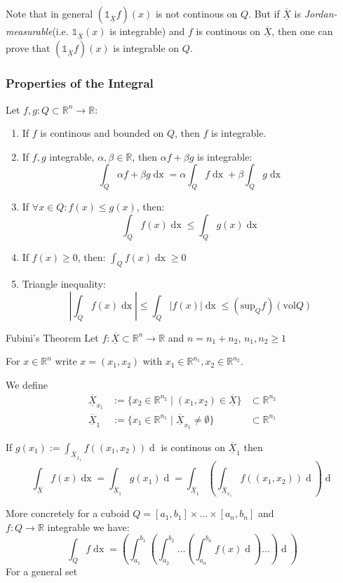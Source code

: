 \documentclass[a4paper,fontsize = 8pt]{scrartcl}
\def\R{\mathbb{R}}
\def\X{\underline{\overline{X}}}
\begin{document}
Note that in general $(\mathds{1}_{\X}f)(x)$ is not continous on $Q$. But if $\X$ is \textit{Jordan-measurable}(i.e. $\mathds{1}_{\X}(x)$ is integrable) and $f$ is continous on $\X$, then one can prove that $(\mathds{1}_{\X}f)(x)$ is integrable on $Q$.

\subsubsection{Properties of the Integral}
Let $f, g: Q \subset \R^n \to \R$:
\begin{enumerate}
  \item If $f$ is continous and bounded on $Q$, then $f$ is integrable.
  \item If $f,g$ integrable, $\alpha, \beta \in \R$, then $\alpha f + \beta g$ is integrable:
  \[\int_Q \alpha f + \beta g \mathop{dx} = \alpha \int_Q f \mathop{dx} + \beta \int_Q g \mathop{dx}\]
  \item If \(\forall x \in Q: f(x) \le g(x)\), then:
  \[\int_Q f(x) \mathop{dx} \le \int_Q g(x) \mathop{dx}\]
  \item If \(f(x) \ge 0\), then:
  \(\int_Q f(x) \mathop{dx} \geq 0\)
  \item Triangle inequality:
    \[\left| \int_Q f(x) \mathop{dx}\right| \le \int_Q \left|f(x)\right| \mathop{dx} \leq (\text{sup}_{Q}f)(\text{vol}Q)\]
\end{enumerate}


\begin{mainbox}{Fubini's Theorem}
    Let $f: \X \subset \R^n \to \R$ and $n = n_1 + n_2$, $n_1, n_2 \geq 1$
    
    For $x \in \R^n$ write $x = (x_1,x_2)$ with $x_1 \in \R^{n_1}, x_2 \in \R^{n_2}$.

    We define 
    \begin{align*}
        \X_{x_1} &:= \{x_2 \in \R^{n_2} \mid (x_1,x_2) \in \X\} &\subset \R^{n_2}\\
        \X_1 &:= \{x_1 \in \R^{n_1} \mid \X_{x_1} \neq \emptyset\} &\subset \R^{n_1}
    \end{align*}

    If $g(x_1) := \int_{\X_{x_1}}f((x_1,x_2))\mathop{dx_2}$ is continous on $\X_1$ then 
    \[\int_{\X}f(x)\mathop{dx} = \int_{\X_1}g(x_1)\mathop{dx_1} = \int_{\X_1}\left(\int_{\X_{x_1}}f((x_1,x_2))\mathop{dx_2}\right)\mathop{dx_1}\]
\end{mainbox}
More concretely for a cuboid $Q = [a_1,b_1]\times ... \times [a_n, b_n]$ and \\$f: Q \to \R$ integrable we have:
\[\int_{Q}f\mathop{dx} = \left(\int_{a_1}^{b_1}\left(\int_{a_2}^{b_2} ...\left(\int_{a_n}^{b_n}f(x)\mathop{dx_n}\right) ... \right)\mathop{dx_1}\right)\]
For a general set 
\end{document}
